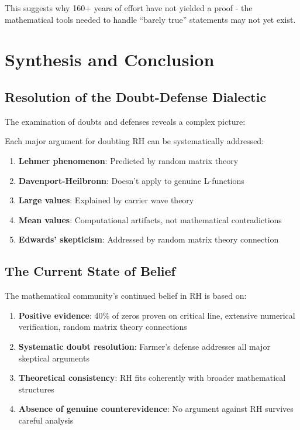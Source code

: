 This suggests why 160+ years of effort have not yielded a proof - the mathematical tools needed to handle ``barely true'' statements may not yet exist.

\section{Synthesis and Conclusion}
\label{sec:synthesis}

\subsection{Resolution of the Doubt-Defense Dialectic}
\label{subsec:dialectic_resolution}

The examination of doubts and defenses reveals a complex picture:

\begin{theorem}
Each major argument for doubting RH can be systematically addressed:
\begin{enumerate}
\item \textbf{Lehmer phenomenon}: Predicted by random matrix theory
\item \textbf{Davenport-Heilbronn}: Doesn't apply to genuine L-functions  
\item \textbf{Large values}: Explained by carrier wave theory
\item \textbf{Mean values}: Computational artifacts, not mathematical contradictions
\item \textbf{Edwards' skepticism}: Addressed by random matrix theory connection
\end{enumerate}
\end{theorem}

\subsection{The Current State of Belief}
\label{subsec:current_belief}

\begin{theorem}
The mathematical community's continued belief in RH is based on:
\begin{enumerate}
\item \textbf{Positive evidence}: 40\% of zeros proven on critical line, extensive numerical verification, random matrix theory connections
\item \textbf{Systematic doubt resolution}: Farmer's defense addresses all major skeptical arguments
\item \textbf{Theoretical consistency}: RH fits coherently with broader mathematical structures
\item \textbf{Absence of genuine counterevidence}: No argument against RH survives careful analysis
\end{enumerate}
\end{theorem}


